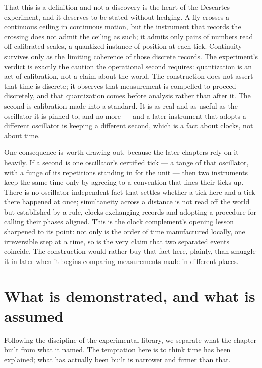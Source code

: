 That this is a definition and not a discovery is the heart of the Descartes experiment, and it deserves
to be stated without hedging. A fly crosses a continuous ceiling in continuous motion, but the
instrument that records the crossing does not admit the ceiling as such; it admits only pairs of
numbers read off calibrated scales, a quantized instance of position at each tick. Continuity survives
only as the limiting coherence of those discrete records. The experiment's verdict is exactly the
caution the operational second requires: quantization is an act of calibration, not a claim about the
world. The construction does not assert that time is discrete; it observes that measurement is
compelled to proceed discretely, and that quantization comes before analysis rather than after it. The
second is calibration made into a standard. It is as real and as useful as the oscillator it is pinned
to, and no more --- and a later instrument that adopts a different oscillator is keeping a different
second, which is a fact about clocks, not about time.

One consequence is worth drawing out, because the later chapters rely on it heavily. If a second is one
oscillator's certified tick --- a tange of that oscillator, with a funge of its repetitions standing
in for the unit --- then two instruments keep the same time only by agreeing to a convention that
lines their ticks up. There is no oscillator-independent fact that settles whether a tick here and a
tick there happened at once; simultaneity across a distance is not read off the world but established
by a rule, clocks exchanging records and adopting a procedure for calling their phases aligned. This
is the clock complement's opening lesson sharpened to its point: not only is the order of time
manufactured locally, one irreversible step at a time, so is the very claim that two separated events
coincide. The construction would rather buy that fact here, plainly, than smuggle it in later when it
begins comparing measurements made in different places.

\section{What is demonstrated, and what is assumed}
\label{se:demonstrated-assumed-ch3}

Following the discipline of the experimental library, we separate what the chapter built from what it
named. The temptation here is to think time has been explained; what has actually been built is
narrower and firmer than that.

